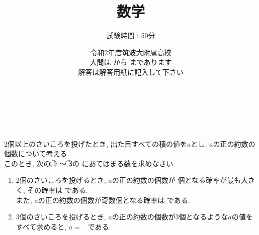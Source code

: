 \documentclass[dvipdfmx, titlepage, 11pt]{jsarticle}
\title{\Huge 数学}
\author{\LARGE 試験時間 : 50分}
\date{\LARGE 令和2年度筑波大附属高校\\[3cm] 大問は \fbox{\Large {\bf 1}} から \fbox{\Large {\bf 5}} まであります\\[0.5cm] 解答は解答用紙に記入して下さい}
\newcommand{\ncircle}[1]{\textcircled{\scriptsize #1}}
\newcommand{\nbox}[1]{\fbox{\hspace{5pt} \textcircled{\scriptsize #1}\hspace{5pt} }}
\newcommand{\ebox}{\fbox{　\hspace{10pt} }}
\begin{document}
\maketitle

\newpage
\thispagestyle{empty}
　
\newpage

\newpage
\thispagestyle{empty}
　
\newpage

\setcounter{page}{1}
\noindent {}\hspace{10pt} 2個以上のさいころを投げたとき, 出た目すべての積の値を$a$とし, $a$の正の約数の個数について考える. \\
このとき, 次の \ncircle{1} 〜 \ncircle{3}の \ebox にあてはまる数を求めなさい. 
\begin{enumerate}[(1)]
\item 2個のさいころを投げるとき, $a$の正の約数の個数が \fbox{\hspace{5pt} \ncircle{1} -- ア\hspace{5pt} } 個となる確率が最も大きく, その確率は \fbox{\hspace{5pt} \ncircle{1} -- イ\hspace{5pt} } である.\\
  また, $a$の正の約数の個数が奇数個となる確率は \nbox{2} である.\\[7cm]
\item 3個のさいころを投げるとき, $a$の正の約数の個数が3個となるような$a$の値をすべて求めると, $a=$\ \nbox{3} である.
\end{enumerate}

\newpage
\end{document}
